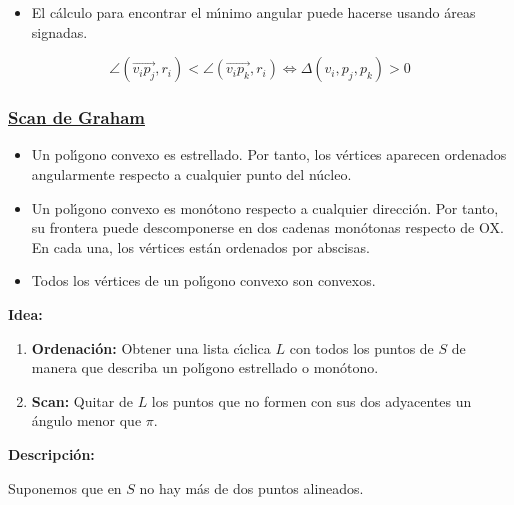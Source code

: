 \documentclass[twoside]{report}
\begin{document}
\begin{observaciones}
\begin{itemize}
\item El c\'{a}lculo para encontrar el m\'{\i}nimo angular puede hacerse
usando \'{a}reas signadas.
\end{itemize}
$$\angle (\overrightarrow{v_ip_j},r_i) <
\angle (\overrightarrow{v_ip_k},r_i) \Leftrightarrow
\Delta(v_i,p_j,p_k)>0$$
\end{observaciones}

\subsubsection{\underline{Scan de Graham}}

\begin{itemize}
  \item Un pol\'{\i}gono convexo es estrellado. Por tanto, los v\'{e}rtices
aparecen ordenados angularmente respecto a cualquier punto del
n\'{u}cleo.
  \item Un pol\'{\i}gono convexo es mon\'{o}tono respecto a cual\-quier
direcci\'{o}n. Por tanto, su frontera puede des\-com\-po\-ner\-se en
dos cadenas mon\'{o}tonas respecto de OX. En cada una, los v\'{e}rtices
est\'{a}n ordenados por abscisas.
  \item Todos los v\'{e}rtices de un pol\'{\i}gono convexo son convexos.
\end{itemize}

\vspace{0.6cm}

{\bf Idea:}

\begin{enumerate}
  \item \textbf{Ordenaci\'{o}n:} Obtener una lista c\'{\i}clica $L$ con todos los puntos de
$S$ de manera que describa un pol\'{\i}gono estrellado o mon\'{o}tono.
  \item \textbf{Scan:} Quitar de $L$ los puntos que no formen con sus dos
adyacentes un \'{a}ngulo menor que $\pi$.
\end{enumerate}


{\bf Descripci\'{o}n:}

Suponemos que en $S$ no hay m\'{a}s de dos puntos alineados.
\end{document}
